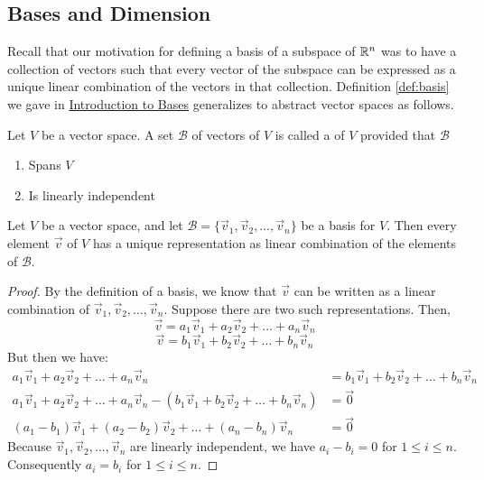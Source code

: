 \documentclass{ximera}
\begin{document}
\subsection*{Bases and Dimension}

Recall that our motivation for defining a basis of a subspace of $\mathbb{R}^n$ was to have a collection of vectors such that every vector of the subspace can be expressed as a unique linear combination of the vectors in that collection.  Definition \ref{def:basis} we gave in \href{https://ximera.osu.edu/oerlinalg/LinearAlgebra/VSP-0030/main}{Introduction to Bases} generalizes to abstract vector spaces as follows.

\begin{definition}\label{def:basisabstract}
Let $V$ be a vector space.  A set $\mathcal{B}$ of vectors of $V$ is called a  of $V$  provided that $\mathcal{B}$
\begin{enumerate}
\item \label{item:defbasis1abstract}
Spans $V$
\item \label{item:defbasis2abstract}
Is linearly independent
\end{enumerate}
\end{definition}

\begin{theorem}\label{th:uniquerep}
Let $V$ be a vector space, and let $\mathcal{B}=\{\vec{v}_1, \vec{v}_2,\ldots,\vec{v}_n\}$ be a basis for $V$.  Then every element $\vec{v}$ of $V$ has a unique representation as linear combination of the elements of $\mathcal{B}$.
\end{theorem}
\begin{proof}
By the definition of a basis, we know that $\vec{v}$ can be written as a linear combination of $\vec{v}_1, \vec{v}_2,\ldots,\vec{v}_n$.  Suppose there are two such representations.  Then,
$$\vec{v}=a_1\vec{v}_1+ a_2\vec{v}_2+\ldots+a_n\vec{v}_n$$
$$\vec{v}=b_1\vec{v}_1+ b_2\vec{v}_2+\ldots+b_n\vec{v}_n$$
But then we have:
\begin{align*}
a_1\vec{v}_1+ a_2\vec{v}_2+\ldots+a_n\vec{v}_n&=b_1\vec{v}_1+ b_2\vec{v}_2+\ldots+b_n\vec{v}_n\\
a_1\vec{v}_1+ a_2\vec{v}_2+\ldots+a_n\vec{v}_n-(b_1\vec{v}_1+ b_2\vec{v}_2+\ldots+b_n\vec{v}_n)&=\vec{0}\\
(a_1-b_1)\vec{v}_1+ (a_2-b_2)\vec{v}_2+\ldots+(a_n-b_n)\vec{v}_n&=\vec{0}
\end{align*}
Because $\vec{v}_1, \vec{v}_2,\ldots,\vec{v}_n$ are linearly independent, we have $a_i-b_i=0$ for $1\leq i\leq n$. Consequently $a_i=b_i$ for $1\leq i\leq n$.
\end{proof}
\end{document}
